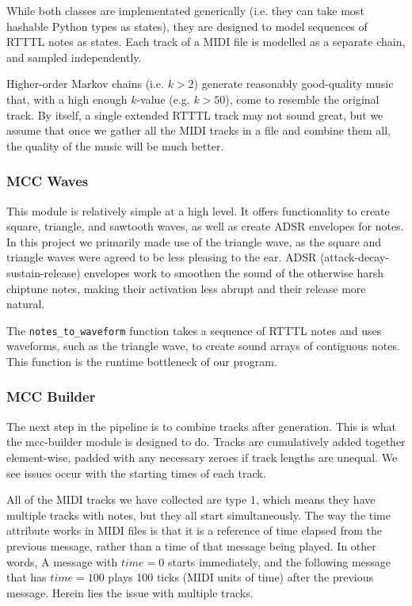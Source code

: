 \documentclass{article}
\begin{document}
While both classes are implementated generically (i.e. they can take most hashable Python types as states), they are designed to model sequences of RTTTL notes as states. 
Each track of a MIDI file is modelled as a separate chain, and sampled independently. 

Higher-order Markov chains (i.e. $k>2$) generate reasonably good-quality music that, with a high enough $k$-value (e.g. $k>50$), come to resemble the original track. By itself, 
a single extended RTTTL track may not sound great, but we assume that once we gather all the MIDI tracks in a file and combine them all, the quality of the music will be much 
better. 

\subsubsection{MCC Waves}
This module is relatively simple at a high level. It offers functionality to create square, triangle, and sawtooth waves, as well as create ADSR envelopes for notes. In 
this project we primarily made use of the triangle wave, as the square and triangle waves were agreed to be less pleasing to the ear. ADSR (attack-decay-sustain-release) 
envelopes work to smoothen the sound of the otherwise harsh chiptune notes, making their activation less abrupt and their release more natural. 

The \texttt{notes\_to\_waveform} function takes a sequence of RTTTL notes and uses waveforms, such as the triangle wave, to create sound arrays of contiguous notes. 
This function is the runtime bottleneck of our program.

\subsubsection{MCC Builder}
The next step in the pipeline is to combine tracks after generation. This is what the mcc-builder module is designed to do. Tracks are cumulatively added together element-wise, 
padded with any necessary zeroes if track lengths are unequal. We see issues occur with the starting times of each track. 

All of the MIDI tracks we have collected are type 1, which means they have multiple tracks with notes, but they all start simultaneously. The way the time attribute works in 
MIDI files is that it is a reference of time elapsed from the previous message, rather than a time of that message being played. In other words, A message with $time = 0$ 
starts immediately, and the following message that has $time = 100$ plays 100 ticks (MIDI units of time) after the previous message. Herein lies the issue with multiple tracks. 
\end{document}
